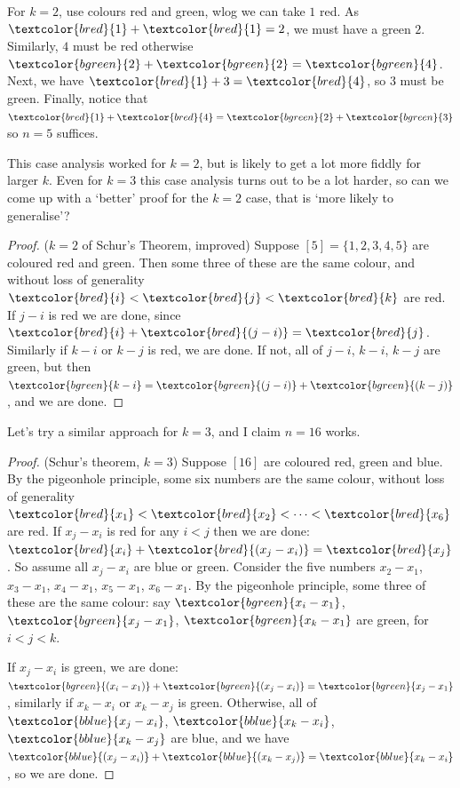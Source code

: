 \documentclass{article}
\begin{document}
\newcommand{\red}[1]{\textcolor{bred}{#1}}
\newcommand{\green}[1]{\textcolor{bgreen}{#1}}
\newcommand{\blue}[1]{\textcolor{bblue}{#1}}
\newcommand{\yellow}[1]{\textcolor{byellow}{#1}}
\newcommand{\orange}[1]{\textcolor{borange}{#1}}
\newcommand{\purple}[1]{\textcolor{bpurple}{#1}}

For $k=2$, use colours \red{red} and \green{green}, wlog we can take \red{$1$ red}.
As $\red{1}+\red{1}=2$, we must have a \green{green $2$}.
Similarly, \red{$4$} must be \red{red} otherwise $\green{2}+\green{2}=\green{4}$.
Next, we have $\red{1} + 3 = \red{4}$, so \green{$3$} must be \green{green}.
Finally, notice that $\red{1} + \red{4} = \green{2} + \green{3}$ so $n = 5$ suffices.

This case analysis worked for $k=2$, but is likely to get a lot more fiddly for larger $k$.
Even for $k=3$ this case analysis turns out to be a lot harder, so can we come up with a `better' proof for the $k=2$ case, that is `more likely to generalise'?

\begin{proof}($k=2$ of Schur's Theorem, improved)
    Suppose $[5] = \{1, 2, 3, 4, 5\}$ are coloured \red{red} and \green{green}.
    Then some three of these are the same colour, and without loss of generality $\red{i} < \red{j} < \red{k}$ are \red{red}.
    If $j-i$ is \red{red} we are done, since $\red{i} + \red{(j-i)} = \red{j}$.
    Similarly if $k-i$ or $k-j$ is \red{red}, we are done.
    If not, all of $j-i$, $k-i$, $k-j$ are \green{green}, but then $\green{k-i} = \green{(j-i)} + \green{(k-j)}$, and we are done.
\end{proof}

Let's try a similar approach for $k=3$, and I claim $n=16$ works.

\begin{proof}(Schur's theorem, $k=3$)
    Suppose $[16]$ are coloured \red{red}, \green{green} and \blue{blue}.
    By the pigeonhole principle, some six numbers are the same colour, without loss of generality $\red{x_1} < \red{x_2} < \dots < \red{x_6}$ are \red{red}.
    If $x_j - x_i$ is \red{red} for any $i<j$ then we are done: $\red{x_i} + \red{(x_j - x_i)} = \red{x_j}$.
    So assume all $x_j - x_i$ are \blue{blue} or \green{green}.
    Consider the five numbers $x_2 - x_1$, $x_3 - x_1$, $x_4 - x_1$, $x_5 - x_1$, $x_6 - x_1$.
    By the pigeonhole principle, some three of these are the same colour: say $\green{x_i - x_1}$, $\green{x_j - x_1}$, $\green{x_k - x_1}$ are green, for $i < j < k$.

    If $x_j - x_i$ is \green{green}, we are done: $\green{(x_i - x_1)} + \green{(x_j - x_i)} = \green{x_j - x_1}$, similarly if $x_k - x_i$ or $x_k - x_j$ is \green{green}.
    Otherwise, all of $\blue{x_j - x_i}$, $\blue{x_k - x_i}$, $\blue{x_k - x_j}$ are \blue{blue}, and we have $\blue{(x_j - x_i)} + \blue{(x_k - x_j)} = \blue{x_k - x_i}$, so we are done.
\end{proof}
\end{document}
